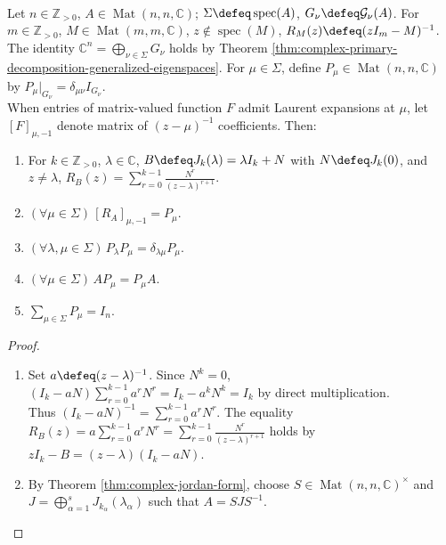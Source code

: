 \begin{proposition} \label{prop:jordan-resolvent-and-primary-projectors} \\
Let $n\in\mathbb{Z}_{>0}$, $A\in\operatorname{Mat}(n,n,\mathbb{C})$; $\Sigma\defeq\operatorname{spec}(A)$, $G_{\nu}\defeq\mathcal{G}_{\nu}(A)$. For $m\in\mathbb{Z}_{>0}$, $M\in\operatorname{Mat}(m,m,\mathbb{C})$, $z\notin\operatorname{spec}(M)$, $R_M(z)\defeq(zI_m-M)^{-1}$.\\
The identity $\mathbb{C}^n=\bigoplus\limits_{\nu\in\Sigma}G_{\nu}$ holds by Theorem \ref{thm:complex-primary-decomposition-generalized-eigenspaces}. For $\mu\in\Sigma$, define $P_{\mu}\in\operatorname{Mat}(n,n,\mathbb{C})$ by $P_{\mu}|_{G_{\nu}}=\delta_{\mu\nu}I_{G_{\nu}}$.\\
When entries of matrix-valued function $F$ admit Laurent expansions at $\mu$, let $[F]_{\mu,-1}$ denote matrix of $(z-\mu)^{-1}$ coefficients. Then:
\begin{enumerate}[label=(\roman*)]
\setlength{\itemsep}{0pt}
\item For $k\in\mathbb{Z}_{>0}$, $\lambda\in\mathbb{C}$, $B\defeq J_k(\lambda)=\lambda I_k+N$ with $N\defeq J_k(0)$, and $z\neq\lambda$, $R_B(z)=\sum\limits_{r=0}^{k-1}\frac{N^r}{(z-\lambda)^{r+1}}$.
\item $(\forall\mu\in\Sigma)\,[R_A]_{\mu,-1}=P_{\mu}$.
\item $(\forall\lambda,\mu\in\Sigma)\,P_{\lambda}P_{\mu}=\delta_{\lambda\mu}P_{\mu}$.
\item $(\forall\mu\in\Sigma)\,AP_{\mu}=P_{\mu}A$.
\item $\sum\limits_{\mu\in\Sigma}P_{\mu}=I_n$.
\end{enumerate}
\begin{proof}
\begin{enumerate}[label=(\roman*)]
\setlength{\itemsep}{0pt}
\item Set $a\defeq(z-\lambda)^{-1}$. Since $N^k=0$, $(I_k-aN)\sum\limits_{r=0}^{k-1}a^rN^r=I_k-a^kN^k=I_k$ by direct multiplication.\\
Thus $(I_k-aN)^{-1}=\sum\limits_{r=0}^{k-1}a^rN^r$. The equality $R_B(z)=a\sum\limits_{r=0}^{k-1}a^rN^r=\sum\limits_{r=0}^{k-1}\frac{N^r}{(z-\lambda)^{r+1}}$ holds by $zI_k-B=(z-\lambda)(I_k-aN)$.
\item By Theorem \ref{thm:complex-jordan-form}, choose $S\in\operatorname{Mat}(n,n,\mathbb{C})^{\times}$ and $J=\bigoplus\limits_{\alpha=1}^sJ_{k_{\alpha}}(\lambda_{\alpha})$ such that $A=SJS^{-1}$.\\

\end{enumerate}
\end{proof}
\end{proposition}
